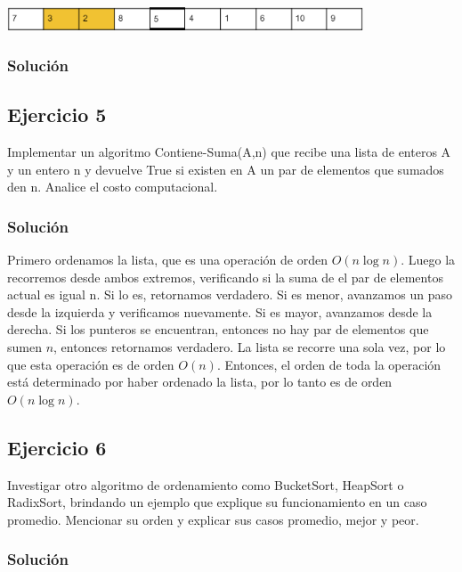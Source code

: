 \documentclass{article}
\begin{document}
\includegraphics[width=400px]{./img/ejemploEjercicio4.png}

\subsubsection*{Solución}



\subsection*{Ejercicio 5}
Implementar un algoritmo Contiene-Suma(A,n) que recibe una lista de enteros A y un entero n y devuelve True si existen en A un par de elementos que sumados den n. Analice el costo computacional.

\subsubsection*{Solución}

Primero ordenamos la lista, que es una operación de orden $O(n \log n)$. Luego la recorremos desde ambos extremos, verificando si la suma de el par de elementos actual es igual n. Si lo es, retornamos verdadero. Si es menor, avanzamos un paso desde la izquierda y verificamos nuevamente. Si es mayor, avanzamos desde la derecha. Si los punteros se encuentran, entonces no hay par de elementos que sumen $n$, entonces retornamos verdadero. La lista se recorre una sola vez, por lo que esta operación es de orden $O(n)$. Entonces, el orden de toda la operación está determinado por haber ordenado la lista, por lo tanto es de orden $O(n \log n)$.



\subsection*{Ejercicio 6}
Investigar otro algoritmo de ordenamiento como BucketSort, HeapSort o RadixSort, brindando un ejemplo que explique su funcionamiento en un caso promedio. Mencionar su orden y explicar sus casos promedio, mejor y peor.

\subsubsection*{Solución}
\end{document}
